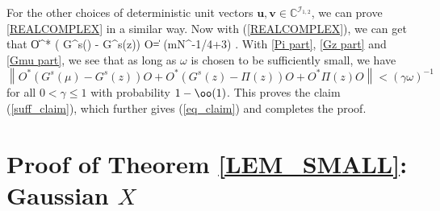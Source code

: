 For the other choices of deterministic unit vectors $\mathbf u ,\mathbf v \in \mathbb C^{\mathcal I_{1,2}}$, we can prove \eqref{REALCOMPLEX} in a similar way. Now with (\ref{REALCOMPLEX}), we can get that %
\be\label{Gmu part}
\left\|O^* \left( G^s(\mu) - G^s(z)\right) O\right\| = \OO(mN^{-1/4+3\e}) \quad {}.
\ee
With \eqref{Pi part}, \eqref{Gz part} and \eqref{Gmu part}, we see that as long as $\omega$ is chosen to be sufficiently small, we have
$$\left\| O^* \left( G^s(\mu) - G^s(z)\right) O+ O^* \left( G^s(z) - \Pi(z)\right) O + O^*  \Pi(z) O\right\| < (\gamma \omega)^{-1}$$
for all $0<\gamma\le 1$ with probability $1-\oo(1)$. This proves the claim (\ref{suff_claim}), which further gives (\ref{eq_claim}) and completes the proof.


\section{Proof of Theorem \ref{LEM_SMALL}: Gaussian $X$}\label{sec_Gauss}


